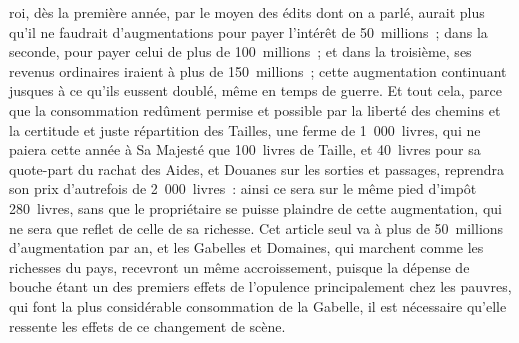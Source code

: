 \documentclass[french,twoside]{book} %
\begin{document}
roi, dès la première année, par le moyen des édits dont on a parlé, aurait plus qu’il ne faudrait d’augmentations pour payer l’intérêt de 50 millions ; dans la seconde, pour payer celui de plus de 100 millions ; et dans la troisième, ses revenus ordinaires iraient à plus de 150 millions ; cette augmentation continuant jusques à ce qu’ils eussent doublé, même en temps de guerre. Et tout cela, parce que la consommation redûment permise et possible par la liberté des chemins et la certitude et juste répartition des Tailles, une ferme de 1 000 livres, qui ne paiera cette année à Sa Majesté que 100 livres de Taille, et 40 livres pour sa quote-part du rachat des Aides, et Douanes sur les sorties et passages, reprendra son prix d’autrefois de 2 000 livres : ainsi ce sera sur le même pied d’impôt 280 livres, sans que le propriétaire se puisse plaindre de cette augmentation, qui ne sera que reflet de celle de sa richesse. Cet article seul va à plus de 50 millions d’augmentation par an, et les Gabelles et Domaines, qui marchent comme les richesses du pays, recevront un même accroissement, puisque la dépense de bouche étant un des premiers effets de l’opulence principalement chez les pauvres, qui font la plus considérable consommation de la Gabelle, il est nécessaire qu’elle ressente les effets de ce changement de scène.\par
\end{document}
